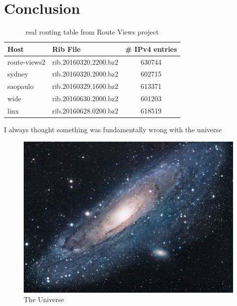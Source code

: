 \documentclass[11pt,a4paper]{article}
\begin{document}
\section{Conclusion}
\begin{table}
	\begin{tabular}{l|l|c}
		\hline
		\hline 
		Host & Rib File & \# IPv4 entries\\
		\hline
		route-views2&rib.20160320.2200.bz2&630744\\
		sydney&rib.20160320.2000.bz2&602715\\
		saopaulo&rib.20160329.1600.bz2&613371\\
		wide&rib.20160630.2000.bz2&601203\\
		linx&rib.20160628.0200.bz2&618519\\
		
		\hline
	\end{tabular}
	\caption{real routing table from Route Views project}
	\label{tab:rvdata}
\end{table}

I always thought something was fundamentally wrong with the universe \citep{adams1995hitchhiker}
\begin{figure}[h!]
	\centering
	\includegraphics[scale=1.7]{universe.jpg}
	\caption{The Universe}
	\label{fig:univerise}
\end{figure}



\end{document}

